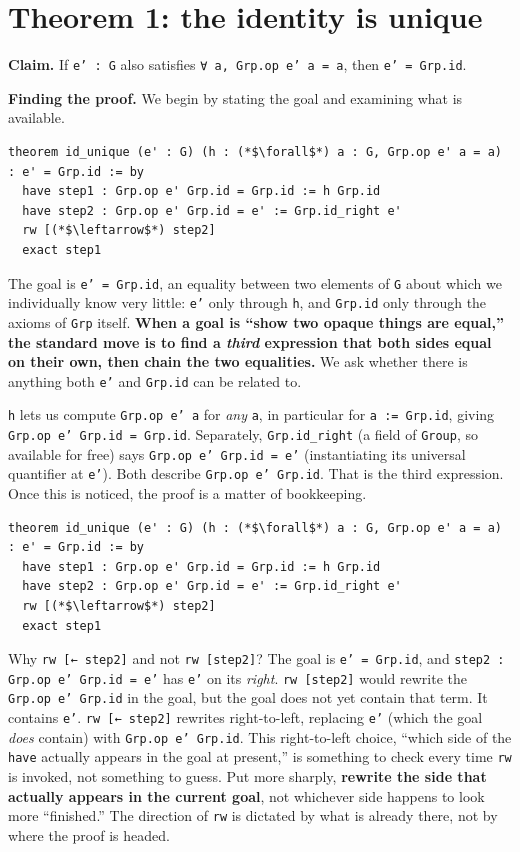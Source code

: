 \section{Theorem 1: the identity is unique}\label{sec:07-group-theorems:02-theorem-1:1}

\textbf{Claim.} If \texttt{e' : G} also satisfies \texttt{∀ a, Grp.op e' a = a}, then \texttt{e' = Grp.id}.

\textbf{Finding the proof.} We begin by stating the goal and examining what is available.

\begin{lstlisting}
theorem id_unique (e' : G) (h : (*$\forall$*) a : G, Grp.op e' a = a) : e' = Grp.id := by
  have step1 : Grp.op e' Grp.id = Grp.id := h Grp.id
  have step2 : Grp.op e' Grp.id = e' := Grp.id_right e'
  rw [(*$\leftarrow$*) step2]
  exact step1
\end{lstlisting}

The goal is \texttt{e' = Grp.id}, an equality between two elements of \texttt{G} about which we individually know very little: \texttt{e'} only through \texttt{h}, and \texttt{Grp.id} only through the axioms of \texttt{Grp} itself. \textbf{When a goal is ``show two opaque things are equal,'' the standard move is to find a \emph{third} expression that both sides equal on their own, then chain the two equalities.} We ask whether there is anything both \texttt{e'} and \texttt{Grp.id} can be related to.

\texttt{h} lets us compute \texttt{Grp.op e' a} for \emph{any} \texttt{a}, in particular for \texttt{a := Grp.id}, giving \texttt{Grp.op e' Grp.id = Grp.id}. Separately, \texttt{Grp.id\_\allowbreak{}right} (a field of \texttt{Group}, so available for free) says \texttt{Grp.op e' Grp.id = e'} (instantiating its universal quantifier at \texttt{e'}). Both describe \texttt{Grp.op e' Grp.id}. That is the third expression. Once this is noticed, the proof is a matter of bookkeeping.

\begin{lstlisting}
theorem id_unique (e' : G) (h : (*$\forall$*) a : G, Grp.op e' a = a) : e' = Grp.id := by
  have step1 : Grp.op e' Grp.id = Grp.id := h Grp.id
  have step2 : Grp.op e' Grp.id = e' := Grp.id_right e'
  rw [(*$\leftarrow$*) step2]
  exact step1
\end{lstlisting}

Why \texttt{rw [← step2]} and not \texttt{rw [step2]}? The goal is \texttt{e' = Grp.id}, and \texttt{step2 : Grp.op e' Grp.id = e'} has \texttt{e'} on its \emph{right}. \texttt{rw [step2]} would rewrite the \texttt{Grp.op e' Grp.id} in the goal, but the goal does not yet contain that term. It contains \texttt{e'}. \texttt{rw [← step2]} rewrites right-to-left, replacing \texttt{e'} (which the goal \emph{does} contain) with \texttt{Grp.op e' Grp.id}. This right-to-left choice, ``which side of the \texttt{have} actually appears in the goal at present,'' is something to check every time \texttt{rw} is invoked, not something to guess. Put more sharply, \textbf{rewrite the side that actually appears in the current goal}, not whichever side happens to look more ``finished.'' The direction of \texttt{rw} is dictated by what is already there, not by where the proof is headed.


